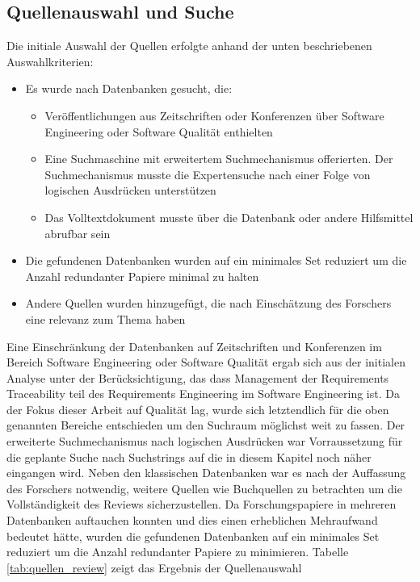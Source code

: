 
\subsection{Quellenauswahl und Suche}
\label{subsec:Quellenauswahl}

Die initiale Auswahl der Quellen erfolgte anhand der unten beschriebenen Auswahlkriterien:

\begin{itemize}
    \item Es wurde nach Datenbanken gesucht, die:
        \begin{itemize}
            \item Veröffentlichungen aus Zeitschriften oder Konferenzen über Software Engineering oder Software Qualität enthielten
            \item Eine Suchmaschine mit erweitertem Suchmechanismus offerierten. Der Suchmechanismus musste die Expertensuche nach einer Folge von logischen Ausdrücken unterstützen
            \item Das Volltextdokument musste über die Datenbank oder andere Hilfsmittel abrufbar sein
        \end{itemize}
    \item Die gefundenen Datenbanken wurden auf ein minimales Set reduziert um die Anzahl redundanter Papiere minimal zu halten
    \item Andere Quellen wurden hinzugefügt, die nach Einschätzung des Forschers eine relevanz zum Thema haben
\end{itemize}

Eine Einschränkung der Datenbanken auf Zeitschriften und Konferenzen im Bereich Software Engineering oder Software Qualität ergab sich aus der initialen Analyse unter der Berücksichtigung, das dass Management der Requirements Traceability teil des Requirements Engineering im Software Engineering ist. Da der Fokus dieser Arbeit auf Qualität lag, wurde sich letztendlich für die oben genannten Bereiche entschieden um den Suchraum möglichst weit zu fassen. Der erweiterte Suchmechanismus nach logischen Ausdrücken war Vorraussetzung für die geplante Suche nach Suchstrings auf die in diesem Kapitel noch näher eingangen wird. Neben den klassischen Datenbanken war es nach der Auffassung des Forschers notwendig, weitere Quellen wie Buchquellen zu betrachten um die Vollständigkeit des Reviews sicherzustellen. Da Forschungspapiere in mehreren Datenbanken auftauchen konnten und dies einen erheblichen Mehraufwand bedeutet hätte, wurden die gefundenen Datenbanken auf ein minimales Set reduziert um die Anzahl redundanter Papiere zu minimieren. Tabelle \ref{tab:quellen_review} zeigt das Ergebnis der Quellenauswahl

